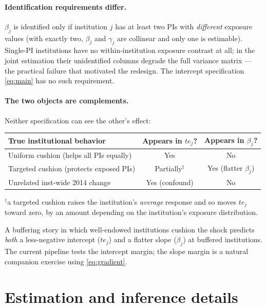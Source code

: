 \documentclass[11pt]{article}
\begin{document}
\paragraph{Identification requirements differ.}
$\beta_j$ is identified only if institution $j$ has at least two PIs with
\emph{different} exposure values (with exactly two, $\beta_j$ and $\gamma_j$
are collinear and only one is estimable). Single-PI institutions have no
within-institution exposure contrast at all; in the joint estimation their
unidentified columns degrade the full variance matrix --- the practical
failure that motivated the redesign. The intercept specification
\eqref{eq:main} has no such requirement.

\paragraph{The two objects are complements.}
Neither specification can see the other's effect:
\begin{center}
\begin{tabular}{@{}lcc@{}}
\toprule
True institutional behavior & Appears in $te_j$? & Appears in $\beta_j$? \\
\midrule
Uniform cushion (helps all PIs equally) & Yes & No \\
Targeted cushion (protects exposed PIs) & Partially$^{\dagger}$ & Yes (flatter $\beta_j$) \\
Unrelated inst-wide 2014 change & Yes (confound) & No \\
\bottomrule
\end{tabular}

{\footnotesize $^{\dagger}$a targeted cushion raises the institution's
\emph{average} response and so moves $te_j$ toward zero, by an amount
depending on the institution's exposure distribution.}
\end{center}
A buffering story in which well-endowed institutions cushion the shock
predicts \emph{both} a less-negative intercept ($te_j$) and a flatter slope
($\beta_j$) at buffered institutions. The current pipeline tests the
intercept margin; the slope margin is a natural companion exercise using
\eqref{eq:gradient}.

\section{Estimation and inference details}
\end{document}
